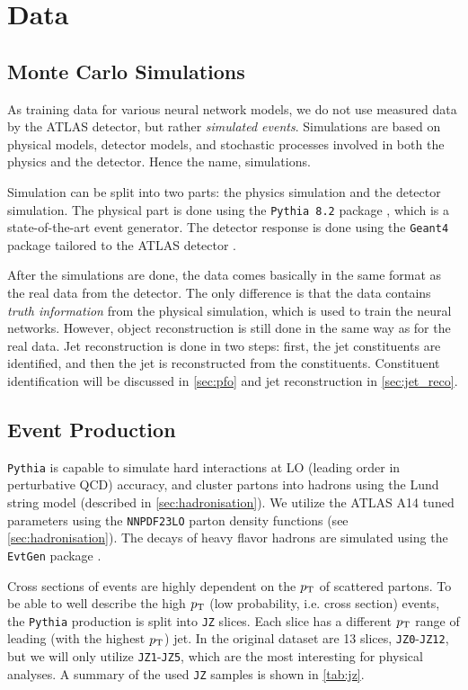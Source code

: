 \chapter{Data}

\section{Monte Carlo Simulations}
As training data for various neural network models, we do not use measured data by the ATLAS detector, but rather \emph{simulated events}. 
Simulations are based on physical models, detector models, and stochastic processes involved in both the physics and the detector.
Hence the name, \MC simulations.

Simulation can be split into two parts: the physics simulation and the detector simulation.
The physical part is done using the \texttt{Pythia 8.2} package \cite{pythia}, which is a state-of-the-art event generator.
The detector response is done using the \texttt{Geant4} package \cite{geant4} tailored to the ATLAS detector \cite{atlas_sym}.

After the simulations are done, the \MC data comes basically in the same format as the real data from the detector.
The only difference is that the \MC data contains \emph{truth information} from the physical simulation, which is used to train the neural networks.
However, object reconstruction is still done in the same way as for the real data.
Jet reconstruction is done in two steps: first, the jet constituents are identified, and then the jet is reconstructed from the constituents. 
Constituent identification will be discussed in \cref{sec:pfo} and jet reconstruction in \cref{sec:jet_reco}.

\section{Event Production}
\label{sec:event_production}
\texttt{Pythia} is capable to simulate hard interactions at LO (leading order in perturbative QCD) accuracy, and cluster partons into hadrons using the Lund string model (described in \cref{sec:hadronisation}).
We utilize the ATLAS A14 tuned parameters \cite{atlas_A14_tunes} using the \texttt{NNPDF23LO} \cite{NNPDF23LO} parton density functions (see \cref{sec:hadronisation}).
The decays of heavy flavor hadrons are simulated using the \texttt{EvtGen} package \cite{EvtGen}.

Cross sections of events are highly dependent on the $p_\text{T}$ of scattered partons. 
To be able to well describe the high $p_\text{T}$ (low probability, i.e. cross section) events, the \MC \texttt{Pythia} production is split into \texttt{JZ} slices. 
Each slice has a different $p_\text{T}$ range of leading (with the highest $p_\text{T}$) jet.
In the original dataset are 13 slices, \texttt{JZ0}-\texttt{JZ12}, but we will only utilize \texttt{JZ1}-\texttt{JZ5}, which are the most interesting for physical analyses.
A summary of the used \texttt{JZ} samples is shown in \cref{tab:jz}. 



